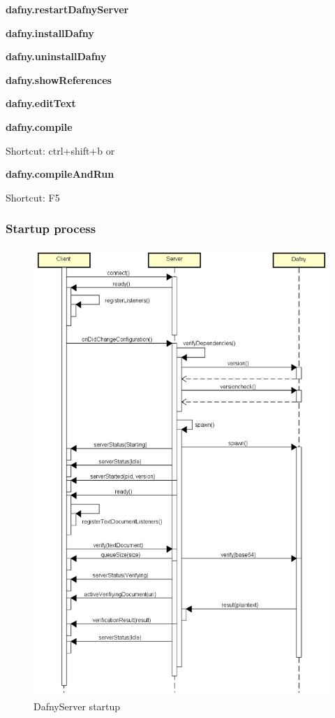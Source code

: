 \textbf{dafny.restartDafnyServer}

\textbf{dafny.installDafny}

\textbf{dafny.uninstallDafny}

\textbf{dafny.showReferences}

\textbf{dafny.editText}

\textbf{dafny.compile}

Shortcut: ctrl+shift+b or %

\textbf{dafny.compileAndRun}

Shortcut: F5


\subsubsection{Startup process}
\begin{figure}[H]
	\centering
	\includegraphics[width=1\textwidth]{img/DafnyStartupFull}
	\caption{DafnyServer startup}
	\label{fig:DafnyServer startup}
\end{figure}

